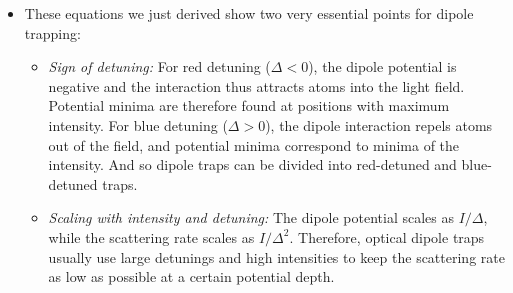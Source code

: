 \documentclass{report}
\theoremstyle{definition}
\begin{document}
\begin{itemize}
\begin{itemize}
		
		\item These equations we just derived show two very essential points for dipole trapping:
		\begin{itemize}
			\item \textit{Sign of detuning:} For red detuning ($\Delta < 0$), the dipole potential is negative and the interaction thus attracts atoms into the light field. Potential minima are therefore found at positions with maximum intensity. For blue detuning ($\Delta > 0$), the dipole interaction repels atoms out of the field, and potential minima correspond to minima of the intensity. And so dipole traps can be divided into red-detuned and blue-detuned traps. 
			\item \textit{Scaling with intensity and detuning:} The dipole potential scales as $I/\Delta$, while the scattering rate scales as $I/\Delta^2$. Therefore, optical dipole traps usually use large detunings and high intensities to keep the scattering rate as low as possible at a certain potential depth.
		\end{itemize}
	

\end{itemize}
\end{itemize}
\end{document}
